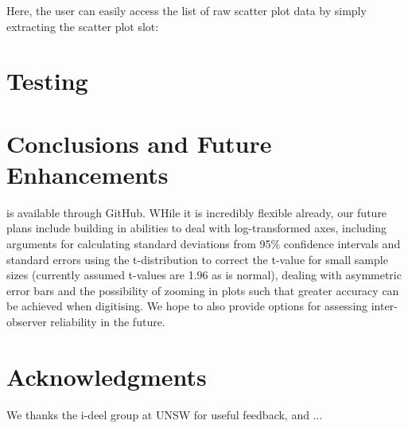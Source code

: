 \documentclass[article]{jss}
\begin{document}
Here, the user can easily access the list of raw scatter plot data by simply extracting the scatter plot slot:

\begin{CodeChunk}
\end{CodeChunk}



\section{Testing}

\section{Conclusions and Future Enhancements}

 is available through GitHub. WHile it is incredibly flexible already, our future plans include building in abilities to deal with log-transformed axes, including arguments for calculating standard deviations from 95\% confidence intervals and standard errors using the t-distribution to correct the t-value for small sample sizes (currently assumed t-values are 1.96 as is normal), dealing with asymmetric error bars and the possibility of zooming in plots such that greater accuracy can be achieved when digitising. We hope to also provide options for assessing inter-observer reliability in the future. 

\section*{Acknowledgments}
We thanks the i-deel group at UNSW for useful feedback, and ...



\end{document}
